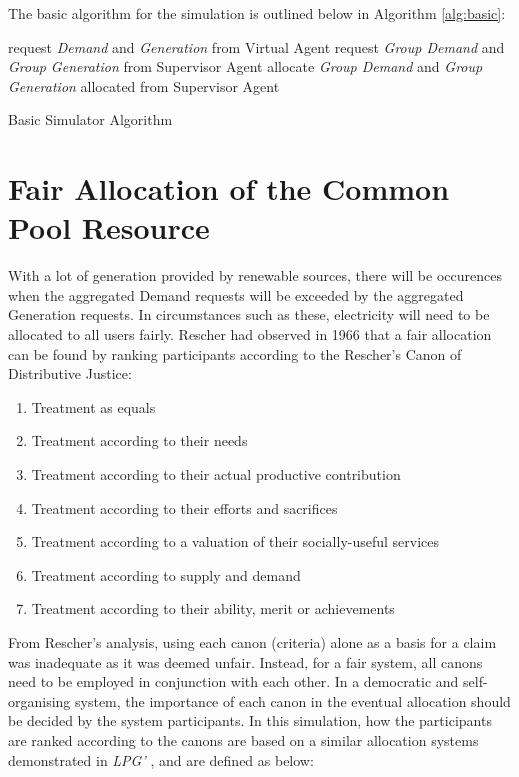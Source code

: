 The basic algorithm for the simulation is outlined below in Algorithm \ref{alg:basic}: \\

\begin{algorithm}[H]
	 {
		request \textit{Demand} and \textit{Generation} from Virtual Agent\;
	}
	 {
		request \textit{Group Demand} and \textit{Group Generation} from Supervisor Agent\;
	}
	 {
		allocate \textit{Group Demand} and \textit{Group Generation} allocated from Supervisor Agent\;
	}
	\caption{Basic Simulator Algorithm}
	\label{alg:basic}
\end{algorithm}

\section*{Fair Allocation of the Common Pool Resource}
With a lot of generation provided by renewable sources, there will be occurences when the aggregated Demand requests will be exceeded by the aggregated Generation requests. In circumstances such as these, electricity will need to be allocated to all users fairly. {\color{red} Rescher had observed in 1966 that a fair allocation can be found by ranking participants according to the Rescher's Canon of Distributive Justice:}

\begin{enumerate} \itemsep1pt \parskip0pt 
	\item Treatment as equals
	\item Treatment according to their needs
	\item Treatment according to their actual productive contribution
	\item Treatment according to their efforts and sacrifices
	\item Treatment according to a valuation of their socially-useful services
	\item Treatment according to supply and demand
	\item Treatment according to their ability, merit or achievements
\end{enumerate}


From Rescher's analysis, using each canon (criteria) alone as a basis for a claim was inadequate as it was deemed unfair. Instead, for a fair system, all canons need to be employed in conjunction with each other. In a democratic and self-organising system, the importance of each canon in the eventual allocation should be decided by the system participants. In this simulation, how the participants are ranked according to the canons are based on a similar allocation systems demonstrated in \textit{LPG'}\cite{PittSASO2012} , and are defined as below:

